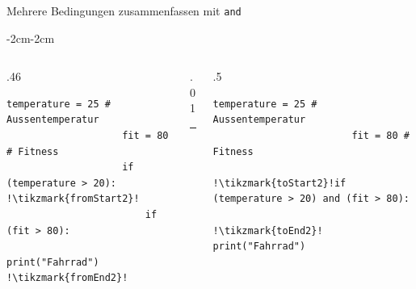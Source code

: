 \begin{frame}[fragile]{Mehrere Bedingungen zusammenfassen mit \lstinline|and|}
    \begin{adjustwidth}{-2cm}{-2cm}
        \begin{columns}
            \begin{column}{.46\pagewidth}
                \begin{lstlisting}[escapechar=!, basicstyle=\footnotesize\ttfamily]
                    temperature = 25 # Aussentemperatur
                    fit = 80 # Fitness
                    if (temperature > 20):   !\tikzmark{fromStart2}!
                        if (fit > 80):
                            print("Fahrrad") !\tikzmark{fromEnd2}!
                \end{lstlisting}
            \end{column}
            \begin{column}{.01\pagewidth}
                \rule{0.4pt}{\textheight}
            \end{column}
            \begin{column}{.5\pagewidth}
                \begin{lstlisting}[escapechar=!, basicstyle=\footnotesize\ttfamily]
                        temperature = 25 # Aussentemperatur
                        fit = 80 # Fitness
                        !\tikzmark{toStart2}!if (temperature > 20) and (fit > 80):
                        !\tikzmark{toEnd2}!   print("Fahrrad")
        \end{lstlisting}
            \end{column}
        \end{columns}
    \end{adjustwidth}
\end{frame}

